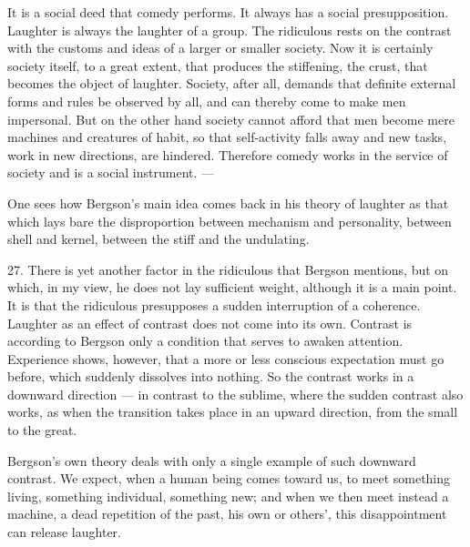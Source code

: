 \documentclass[12pt,a4paper,openany]{book}
\newcommand{\opage}[1]{\marginnote{\footnotesize\textit{[#1]}}}
\begin{document}
It is a social deed that comedy performs. It always has a social presupposition. Laughter is always the laughter of a group. The ridiculous rests on the contrast with the customs and ideas of a larger or smaller society. Now it is certainly society itself, to a great extent, that produces the stiffening, the crust, that becomes the object of laughter. Society, after all, demands that definite external forms and rules be observed by all, and can thereby come to make men impersonal. But on the other hand society cannot afford that men become mere machines and creatures of habit, so that self-activity falls away and new tasks, work in new directions, are hindered. Therefore comedy works in the service of society and is a social instrument. ---

One sees how Bergson's main idea comes back in his theory of laughter as that which lays bare the disproportion between mechanism and personality, between shell and kernel, between the stiff and the undulating.

27. There is yet another factor in the ridiculous that Bergson mentions, but on which, in my view, he does not lay sufficient weight, although it is a main point. It is that the ridiculous presupposes a sudden interruption of a coherence. Laughter as an effect of contrast does not come into its own. Contrast is according to Bergson only a condition that serves to awaken attention. Experience shows, however, that a more or less conscious expectation must go before, which suddenly dissolves into nothing. So the contrast works in a
\opage{49}downward direction --- in contrast to the sublime, where the sudden contrast also works, as when the transition takes place in an upward direction, from the small to the great.

Bergson's own theory deals with only a single example of such downward contrast. We expect, when a human being comes toward us, to meet something living, something individual, something new; and when we then meet instead a machine, a dead repetition of the past, his own or others', this disappointment can release laughter.
\end{document}
